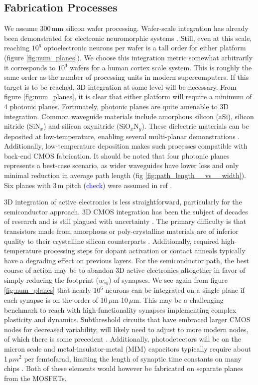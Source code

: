\documentclass[twocolumn]{article}
\begin{document}
\subsection{Fabrication Processes}
\label{sec:fabrication}
We assume 300\,mm silicon wafer processing. Wafer-scale integration has already been demonstrated for electronic neuromorphic systems \cite{schemmel2010wafer}. Still, even at this scale, reaching $10^6$ optoelectronic neurons per wafer is a tall order for either platform (figure \ref{fig:num_planes}). We choose this integration metric somewhat arbitrarily \textemdash it corresponds to $10^4$ wafers for a human cortex scale system. This is roughly the same order as the number of processing units in modern supercomputers. If this target is to be reached, 3D integration at some level will be necessary. From figure \ref{fig:num_planes}, it is clear that either platform will require a minimum of 4 photonic planes. Fortunately, photonic planes are quite amenable to 3D integration. Common waveguide materials include amorphous silicon (aSi), silicon nitride (SiN$_x$) and silicon oxynitride (SiO$_x$N$_y$). These dielectric materials can be deposited at low-temperature, enabling several multi-planar demonstrations \cite{shpa2015,sahu2015,chbu2017,zhli2018}. Additionally, low-temperature deposition makes such processes compatible with back-end CMOS fabrication. It should be noted that four photonic planes represents a best-case scenario, as wider waveguides have lower loss and only minimal reduction in average path length (fig \ref{fig:path_length__vs__width}). Six planes with 3\,\textmu m pitch \textcolor{blue}{(check)} were assumed in ref \cite{shainline2017superconducting}.

3D integration of active electronics is less straightforward, particularly for the semiconductor approach. 3D CMOS integration has been the subject of decades of research and is still plagued with uncertainty  \cite{lish2017}. The primary difficulty is that transistors made from amorphous or poly-crystalline materials are of inferior quality to their crystalline silicon counterparts \cite{}. Additionally, required high-temperature processing steps for dopant activation or contact anneals typically have a degrading effect on previous layers. For the semiconductor path, the best course of action may be to abandon 3D active electronics altogether in favor of simply reducing the footprint ($w_{sy}$) of synapses. We see again from figure \ref{fig:num_planes} that nearly $10^6$ neurons can be integrated on a single plane if each synapse is on the order of 10\,$\mu$m\,\times\,10\,$\mu$m. This may be a challenging benchmark to reach with high-functionality synapses implementing complex plasticity and dynamics. Subthreshold circuits that have embraced larger CMOS nodes for decreased variability, will likely need to adjust to more modern nodes, of which there is some precedent \cite{rupa2019}. Additionally, photodetectors will be on the micron scale and metal-insulator-metal (MIM) capacitors typically require about 1\,$\mu m^2$ per femtofarad, limiting the length of synaptic time constants on many chips \cite{indiveri2019importance}. Both of these elements would however be fabricated on separate planes from the MOSFETs.
\end{document}
